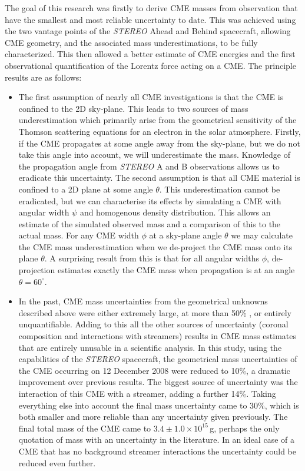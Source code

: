 The goal of this research was firstly to derive CME masses from observation that have the smallest and most reliable uncertainty to date. This was achieved using the two vantage points of the \emph{STEREO} Ahead and Behind spacecraft, allowing CME geometry, and the associated mass underestimations, to be fully characterized. This then allowed a better estimate of CME energies and the first observational quantification of the Lorentz force acting on a CME. The principle results are as follows:
\begin{itemize}
\item The first assumption of nearly all CME investigations is that the CME is confined to the 2D sky-plane. This leads to two sources of mass underestimation which primarily arise from the geometrical sensitivity of the Thomson scattering equations for an electron in the solar atmosphere. Firstly, if the CME propagates at some angle away from the sky-plane, but we do not take this angle into account, we will underestimate the mass. Knowledge of the propagation angle from \emph{STEREO} A and B observations allows us to eradicate this uncertainty. The second assumption is that all CME material is confined to a 2D plane at some angle $\theta$. This underestimation cannot be eradicated, but we can characterise its effects by simulating a CME with angular width $\psi$ and homogenous density distribution. This allows an estimate of the simulated observed mass and a comparison of this to the actual mass. For any CME width $\phi$ at a sky-plane angle $\theta$ we may calculate the CME mass underestimation when we de-project the CME mass onto its plane $\theta$. A surprising result from this is that for all angular widths $\phi$, de-projection estimates exactly the CME mass when propagation is at an angle $\theta=60^{\circ}$.

\item In the past, CME mass uncertainties from the geometrical unknowns described above were either extremely large, at more than 50\% \citep{vou00}, or entirely unquantifiable. Adding to this all the other sources of uncertainty (coronal composition and interactions with streamers) results in CME mass estimates that are entirely unusable in a scientific analysis. In this study, using the capabilities of the \emph{STEREO} spacecraft, the geometrical mass uncertainties of the CME occurring on 12 December 2008 were reduced to 10\%, a dramatic improvement over previous results. The biggest source of uncertainty was the interaction of this CME with a streamer, adding a further 14\%. Taking everything else into account the final mass uncertainty came to 30\%, which is both smaller and more reliable than any uncertainty given previously. The final total mass of the CME came to
$3.4\pm1.0\times10^{15}$\,g, perhaps the only quotation of mass with an uncertainty in the literature. In an ideal case of a CME that has no background streamer interactions the uncertainty could be reduced even further.


\end{itemize}
